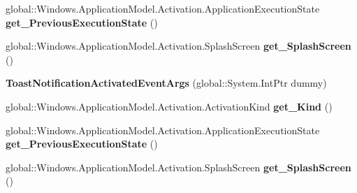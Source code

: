 \begin{DoxyCompactItemize}
global\+::\+Windows.\+Application\+Model.\+Activation.\+Application\+Execution\+State {\bfseries get\+\_\+\+Previous\+Execution\+State} ()
\item 
\mbox{\label{class_windows_1_1_application_model_1_1_activation_1_1_toast_notification_activated_event_args_a90827792bc4f708f1af8e353d6ed679d}} 
global\+::\+Windows.\+Application\+Model.\+Activation.\+Splash\+Screen {\bfseries get\+\_\+\+Splash\+Screen} ()
\item 
\mbox{\label{class_windows_1_1_application_model_1_1_activation_1_1_toast_notification_activated_event_args_aeba1d5057c3f3ef8e59a2c8c8c96c3c9}} 
{\bfseries Toast\+Notification\+Activated\+Event\+Args} (global\+::\+System.\+Int\+Ptr dummy)
\item 
\mbox{\label{class_windows_1_1_application_model_1_1_activation_1_1_toast_notification_activated_event_args_a49cda07e94e3df98532a7f562fe38320}} 
global\+::\+Windows.\+Application\+Model.\+Activation.\+Activation\+Kind {\bfseries get\+\_\+\+Kind} ()
\item 
\mbox{\label{class_windows_1_1_application_model_1_1_activation_1_1_toast_notification_activated_event_args_aff1b6517a3d14fecc9d03119b959c278}} 
global\+::\+Windows.\+Application\+Model.\+Activation.\+Application\+Execution\+State {\bfseries get\+\_\+\+Previous\+Execution\+State} ()
\item 
\mbox{\label{class_windows_1_1_application_model_1_1_activation_1_1_toast_notification_activated_event_args_a90827792bc4f708f1af8e353d6ed679d}} 
global\+::\+Windows.\+Application\+Model.\+Activation.\+Splash\+Screen {\bfseries get\+\_\+\+Splash\+Screen} ()
\item 
\mbox{\label{class_windows_1_1_application_model_1_1_activation_1_1_toast_notification_activated_event_args_aeba1d5057c3f3ef8e59a2c8c8c96c3c9}} 

\end{DoxyCompactItemize}

